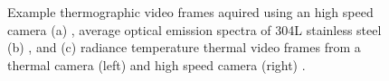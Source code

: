 \begin{figure}
    \centering
    \qquad
    \qquad
    \caption[Level 3 measurement methods.]{Example thermographic video frames aquired using an high speed camera (a) \cite{zhirnov_accurate_2020}, average optical emission spectra of 304L stainless steel (b) \cite{lough_-situ_2020}, and (c) radiance temperature thermal video frames from a thermal camera (left) and high speed camera (right) \cite{lane_measurements_2020}.}
\end{figure}
